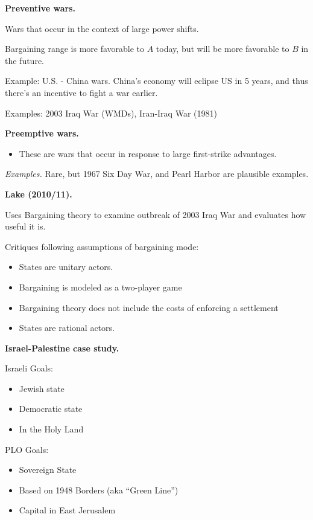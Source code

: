 \documentclass{article}
\begin{document}
{\bf Preventive wars.}

Wars that occur in the context of large power shifts.

Bargaining range is more favorable to $A$ today, but will be more favorable to $B$ in the future.

Example: U.S. - China wars.  China's economy will eclipse US in 5 years, and thus there's an incentive to fight a war earlier.

Examples: 2003 Iraq War (WMDs), Iran-Iraq War (1981)

{\bf Preemptive wars.}

\begin{itemize}
  \item  These are wars that occur in response to large first-strike advantages.
\end{itemize}

{\it Examples.} Rare, but 1967 Six Day War, and Pearl Harbor are plausible examples.

{\bf Lake (2010/11).}

Uses Bargaining theory to examine outbreak of 2003 Iraq War and evaluates how useful it is.

Critiques following assumptions of bargaining mode:
\begin{itemize}
  \item States are unitary actors.
  \item Bargaining is modeled as a two-player game
  \item Bargaining theory does not include the costs of enforcing a settlement
  \item States are rational actors.
\end{itemize}

{\bf Israel-Palestine case study.}

Israeli Goals:

\begin{itemize}
  \item Jewish state
  \item Democratic state
  \item In the Holy Land
\end{itemize}

PLO Goals:
\begin{itemize}
  \item Sovereign State
  \item Based on 1948 Borders (aka ``Green Line'')
  \item Capital in East Jerusalem
\end{itemize}
\end{document}
